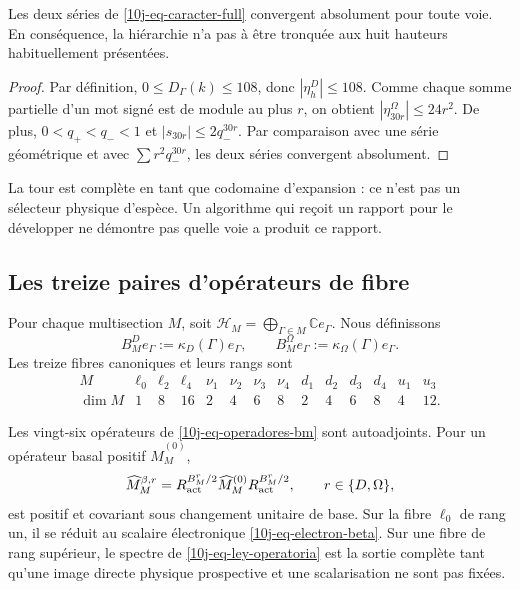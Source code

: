 \begin{proposition}
\label{10j-prop-convergencia-torres}
Les deux séries de \eqref{10j-eq-caracter-full} convergent absolument pour toute voie. En conséquence, la hiérarchie n'a pas à être tronquée aux huit hauteurs habituellement présentées.
\end{proposition}

\begin{proof}
Par définition, \(0\le D_\Gamma(k)\le108\), donc \(|\eta_h^D|\le108\). Comme chaque somme partielle d'un mot signé est de module au plus \(r\), on obtient \(|\eta_{30r}^\Omega|\le24r^2\). De plus, \(0<q_+<q_-<1\) et \(|s_{30r}|\le2q_-^{30r}\). Par comparaison avec une série géométrique et avec \(\sum r^2q_-^{30r}\), les deux séries convergent absolument.
\end{proof}

La tour est complète en tant que codomaine d'expansion : ce n'est pas un sélecteur physique d'espèce. Un algorithme qui reçoit un rapport pour le développer ne démontre pas quelle voie a produit ce rapport.

\subsection{Les treize paires d'opérateurs de fibre}

Pour chaque multisection \(M\), soit \(
 \mathcal H_M=\bigoplus_{\Gamma\in M}\mathbb C e_\Gamma
\). Nous définissons
\begin{equation}
 B_M^D e_\Gamma:=\kappa_D(\Gamma)e_\Gamma,
 \qquad
 B_M^\Omega e_\Gamma:=\kappa_\Omega(\Gamma)e_\Gamma.
 \label{10j-eq-operadores-bm}
\end{equation}
Les treize fibres canoniques et leurs rangs sont
\begin{equation}
 \begin{array}{c|ccccccccccccc}
 M&\ell_0&\ell_2&\ell_4&\nu_1&\nu_2&\nu_3&\nu_4
  &d_1&d_2&d_3&d_4&u_1&u_3\\ \hline
 \dim M&1&8&16&2&4&6&8&2&4&6&8&4&12.
 \end{array}
 \label{10j-eq-trece-fibras}
\end{equation}

\begin{theorem}
\label{10j-thm-ley-operatoria}
Les vingt-six opérateurs de \eqref{10j-eq-operadores-bm} sont autoadjoints. Pour un opérateur basal positif \(\widehat M_M^{(0)}\),
\begin{equation}
 \widehat M_M^{\beta,r}
 =R_{\rm act}^{B_M^r/2}
  \widehat M_M^{(0)}
  R_{\rm act}^{B_M^r/2},
 \qquad r\in\{D,\Omega\},
 \label{10j-eq-ley-operatoria}
\end{equation}
est positif et covariant sous changement unitaire de base. Sur la fibre \(\ell_0\) de rang un, il se réduit au scalaire électronique \eqref{10j-eq-electron-beta}. Sur une fibre de rang supérieur, le spectre de \eqref{10j-eq-ley-operatoria} est la sortie complète tant qu'une image directe physique prospective et une scalarisation ne sont pas fixées.
\end{theorem}

